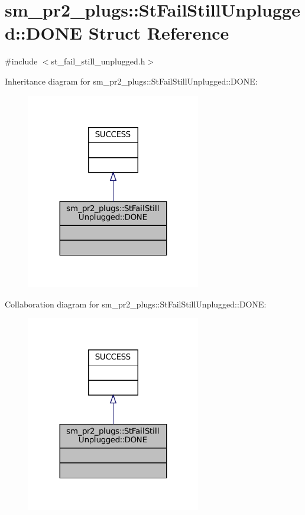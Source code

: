 \hypertarget{structsm__pr2__plugs_1_1StFailStillUnplugged_1_1DONE}{}\section{sm\+\_\+pr2\+\_\+plugs\+:\+:St\+Fail\+Still\+Unplugged\+:\+:D\+O\+NE Struct Reference}
\label{structsm__pr2__plugs_1_1StFailStillUnplugged_1_1DONE}


{\ttfamily \#include $<$st\+\_\+fail\+\_\+still\+\_\+unplugged.\+h$>$}



Inheritance diagram for sm\+\_\+pr2\+\_\+plugs\+:\+:St\+Fail\+Still\+Unplugged\+:\+:D\+O\+NE\+:
\nopagebreak
\begin{figure}[H]
\begin{center}
\leavevmode
\includegraphics[width=215pt]{structsm__pr2__plugs_1_1StFailStillUnplugged_1_1DONE__inherit__graph}
\end{center}
\end{figure}


Collaboration diagram for sm\+\_\+pr2\+\_\+plugs\+:\+:St\+Fail\+Still\+Unplugged\+:\+:D\+O\+NE\+:
\nopagebreak
\begin{figure}[H]
\begin{center}
\leavevmode
\includegraphics[width=215pt]{structsm__pr2__plugs_1_1StFailStillUnplugged_1_1DONE__coll__graph}
\end{center}
\end{figure}


